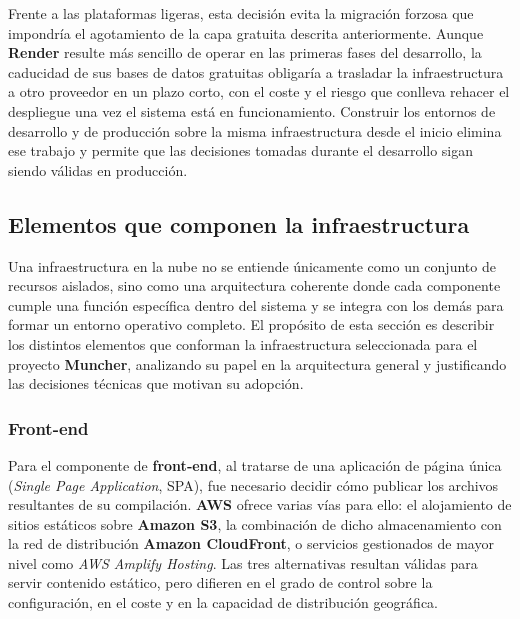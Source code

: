 Frente a las plataformas ligeras, esta decisión evita la migración forzosa que impondría el agotamiento de la capa gratuita descrita anteriormente. Aunque \textbf{Render} resulte más sencillo de operar en las primeras fases del desarrollo, la caducidad de sus bases de datos gratuitas obligaría a trasladar la infraestructura a otro proveedor en un plazo corto, con el coste y el riesgo que conlleva rehacer el despliegue una vez el sistema está en funcionamiento. Construir los entornos de desarrollo y de producción sobre la misma infraestructura desde el inicio elimina ese trabajo y permite que las decisiones tomadas durante el desarrollo sigan siendo válidas en producción.

\subsection*{Elementos que componen la infraestructura}

Una infraestructura en la nube no se entiende únicamente como un conjunto de recursos aislados, sino como una arquitectura coherente donde cada componente cumple una función específica dentro del sistema y se integra con los demás para formar un entorno operativo completo. El propósito de esta sección es describir los distintos elementos que conforman la infraestructura seleccionada para el proyecto \textbf{Muncher}, analizando su papel en la arquitectura general y justificando las decisiones técnicas que motivan su adopción.

\subsubsection*{Front-end}

Para el componente de \textbf{front‑end}, al tratarse de una aplicación de página única (\textit{Single Page Application}, SPA), fue necesario decidir cómo publicar los archivos resultantes de su compilación. \textbf{AWS} ofrece varias vías para ello: el alojamiento de sitios estáticos sobre \textbf{Amazon S3}, la combinación de dicho almacenamiento con la red de distribución \textbf{Amazon CloudFront}, o servicios gestionados de mayor nivel como \textit{AWS Amplify Hosting}. Las tres alternativas resultan válidas para servir contenido estático, pero difieren en el grado de control sobre la configuración, en el coste y en la capacidad de distribución geográfica.

